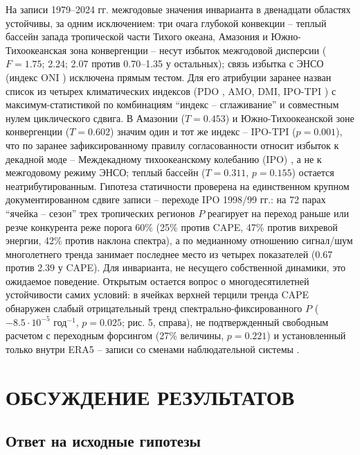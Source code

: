 \documentclass[12pt,a4paper]{article}
\begin{document}
На записи 1979--2024 гг. межгодовые значения инварианта в двенадцати областях устойчивы, за одним исключением: три очага глубокой конвекции -- теплый бассейн запада тропической части Тихого океана, Амазония и Южно-Тихоокеанская зона конвергенции -- несут избыток межгодовой дисперсии ($F = 1.75$; 2.24; 2.07 против 0.70--1.35 у остальных); связь избытка с ЭНСО (индекс ONI \cite{Trenberth1997}) исключена прямым тестом. Для его атрибуции заранее назван список из четырех климатических индексов (PDO \cite{Newman2016}, AMO, DMI, IPO-TPI \cite{Henley2015}) с максимум-статистикой по комбинациям “индекс -- сглаживание” и совместным нулем циклического сдвига. В Амазонии ($T = 0.453$) и Южно-Тихоокеанской зоне конвергенции ($T = 0.602$) значим один и тот же индекс -- IPO-TPI ($p = 0.001$), что по заранее зафиксированному правилу согласованности относит избыток к декадной моде -- Междекадному тихоокеанскому колебанию (IPO) \cite{Power1999,Henley2015}, а не к межгодовому режиму ЭНСО; теплый бассейн ($T = 0.311$, $p = 0.155$) остается неатрибутированным. Гипотеза статичности проверена на единственном крупном документированном сдвиге записи -- переходе IPO 1998/99 гг.: на 72 парах “ячейка -- сезон” трех тропических регионов $P$ реагирует на переход раньше или резче конкурента реже порога 60\% (25\% против CAPE, 47\% против вихревой энергии, 42\% против наклона спектра), а по медианному отношению сигнал/шум многолетнего тренда занимает последнее место из четырех показателей (0.67 против 2.39 у CAPE). Для инварианта, не несущего собственной динамики, это ожидаемое поведение. Открытым остается вопрос о многодесятилетней устойчивости самих условий: в ячейках верхней терцили тренда CAPE обнаружен слабый отрицательный тренд спектрально-фиксированного $P$ ($-8.5 \cdot 10^{-5}$ год$^{-1}$, $p = 0.025$; рис. 5, справа), не подтвержденный свободным расчетом с переходным форсингом (27\% величины, $p = 0.221$) и установленный только внутри ERA5 -- записи со сменами наблюдательной системы \cite{Bengtsson2004}.

\section{ОБСУЖДЕНИЕ РЕЗУЛЬТАТОВ}

\subsection{Ответ на исходные гипотезы}
\end{document}
